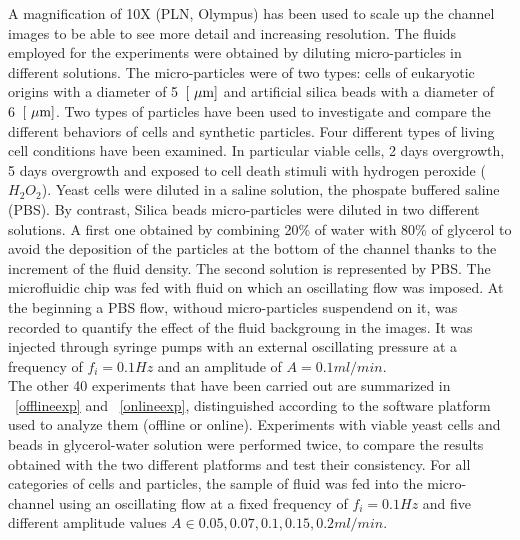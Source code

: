 \documentclass[journal]{IEEEtran}
\theoremstyle{definition}
\theoremstyle{remark}
\begin{document}
A magnification of 10X (PLN, Olympus) has been used to scale up the channel images to be able to see more detail and increasing resolution.
The fluids employed for the experiments were obtained by diluting micro-particles in different solutions. The micro-particles were of two types: cells of eukaryotic origins with a diameter of 5~$[\rm~\mu m]$ and artificial silica beads with a diameter of 6~$[\rm~\mu m]$. Two types of particles have been used to investigate and compare the different behaviors of cells and synthetic particles. Four different types of living cell conditions have been examined. In particular viable cells, 2 days overgrowth, 5 days overgrowth and exposed to cell death stimuli with hydrogen peroxide ($H_2O_2$).  
Yeast cells were diluted in a saline solution, the phospate buffered saline (PBS). By contrast, Silica beads micro-particles were diluted in two different solutions. A first one obtained by combining 20\% of water with 80\% of glycerol to avoid the deposition of the particles at the bottom of the channel thanks to the increment of the fluid density. The second solution is represented by PBS.
The microfluidic chip was fed with fluid on which an oscillating flow was imposed.
At the beginning a PBS flow, withoud micro-particles suspendend on it, was recorded to quantify the effect of the fluid backgroung in the images. It was injected through syringe pumps with an external oscillating pressure at a frequency of $f_i= 0.1 Hz$ and an amplitude of $A=0.1 ml/min$. 
\\The other 40 experiments that have been carried out are summarized in ~\tab\ref{offlineexp} and ~\tab\ref{onlineexp}, distinguished according to the software platform used to analyze them (offline or online). Experiments with viable yeast cells and beads in glycerol-water solution were performed twice, to compare the results obtained with the two different platforms and test their consistency.
For all categories of cells and particles, the sample of fluid was fed into the micro-channel using an oscillating flow at a fixed frequency of $f_i= 0.1 Hz$ and five different amplitude values $A \in{0.05, 0.07, 0.1, 0.15, 0.2 ml/min}$.
\end{document}
